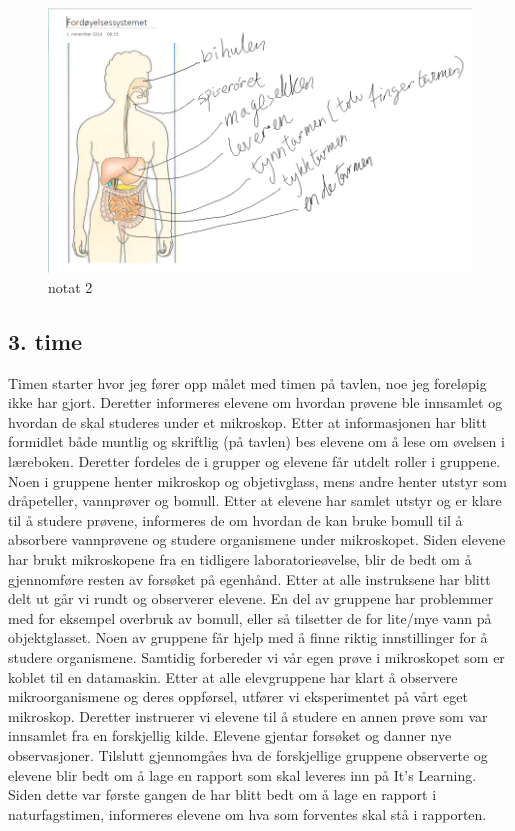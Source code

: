 \documentclass[main.tex]{subfiles}
\begin{document}
\begin{figure}[h!]
\includegraphics[scale = 0.6]{../figures/onenote_fordoyelse.png}
\caption{notat 2}
\label{fig:notat2}
\end{figure}

\subsection*{3. time}

Timen starter hvor jeg fører opp målet med timen på tavlen, noe jeg foreløpig ikke har gjort. Deretter 
informeres elevene om hvordan prøvene ble innsamlet
og hvordan de skal studeres under et mikroskop. Etter at informasjonen har blitt formidlet både
muntlig og skriftlig (på tavlen) bes elevene om å lese om øvelsen i læreboken. Deretter
fordeles de i grupper og elevene får utdelt roller i gruppene. Noen i gruppene henter
mikroskop og objetivglass, mens andre henter utstyr som dråpeteller, vannprøver og bomull.
Etter at elevene har samlet utstyr og er klare til å studere prøvene, informeres de
om hvordan de kan bruke bomull til å absorbere vannprøvene og studere organismene under mikroskopet.
Siden elevene har brukt mikroskopene fra en tidligere laboratorieøvelse, blir de bedt om å 
gjennomføre resten av forsøket på egenhånd. Etter at alle instruksene har blitt delt ut går vi
rundt og observerer elevene. 
En del av gruppene har problemmer med for eksempel overbruk av bomull, 
eller så tilsetter de for lite/mye vann på objektglasset. Noen av gruppene får hjelp med å finne 
riktig innstillinger for å studere organismene. 
Samtidig forbereder vi vår egen prøve i mikroskopet som er koblet til en datamaskin. Etter at alle elevgruppene 
har klart å observere mikroorganismene og deres oppførsel, utfører vi eksperimentet på vårt eget mikroskop.
Deretter instruerer vi elevene til å studere en annen prøve som var innsamlet fra en forskjellig kilde. Elevene 
gjentar forsøket og danner nye observasjoner. 
Tilslutt gjennomgåes hva de forskjellige gruppene observerte og elevene blir bedt om å lage en rapport som skal 
leveres inn på It's Learning. Siden dette var første gangen de har blitt bedt om å lage en rapport i naturfagstimen, 
informeres elevene om hva som forventes skal stå i rapporten.
\end{document}
